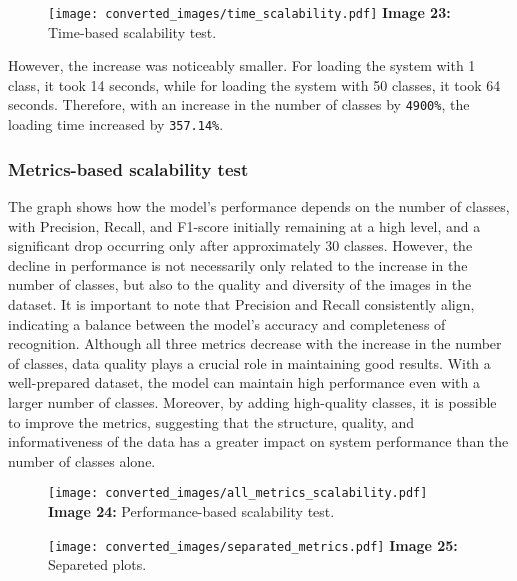 \documentclass{article}
\begin{document}
\hspace*{1.00cm}
\begin{figure}[H]
    \centering
    \texttt{[image: converted\_images/time\_scalability.pdf]}
    \textbf{Image 23:} Time-based scalability test.
\end{figure}

\hspace*{1.00cm}However, the increase was noticeably smaller. For loading the system with 1 class, it took 14 seconds, while for loading the system with 50 classes, it took 64 seconds. Therefore, with an increase in the number of classes by \texttt{4900\%}, the loading time increased by \texttt{357.14\%}.

\subsubsection*{Metrics-based scalability test}
 \hspace*{1.00cm}The graph shows how the model's performance depends on the number of classes, with Precision, Recall, and F1-score initially remaining at a high level, and a significant drop occurring only after approximately 30 classes. However, the decline in performance is not necessarily only related to the increase in the number of classes, but also to the quality and diversity of the images in the dataset. It is important to note that Precision and Recall consistently align, indicating a balance between the model's accuracy and completeness of recognition. Although all three metrics decrease with the increase in the number of classes, data quality plays a crucial role in maintaining good results. With a well-prepared dataset, the model can maintain high performance even with a larger number of classes. Moreover, by adding high-quality classes, it is possible to improve the metrics, suggesting that the structure, quality, and informativeness of the data has a greater impact on system performance than the number of classes alone.

\begin{figure}[H]
    \centering
    \texttt{[image: converted\_images/all\_metrics\_scalability.pdf]}
    \textbf{Image 24:} Performance-based scalability test.
\end{figure}
\begin{figure}[H]
    \centering
    \texttt{[image: converted\_images/separated\_metrics.pdf]}
    \textbf{Image 25:} Separeted plots.
\end{figure}
\end{document}
